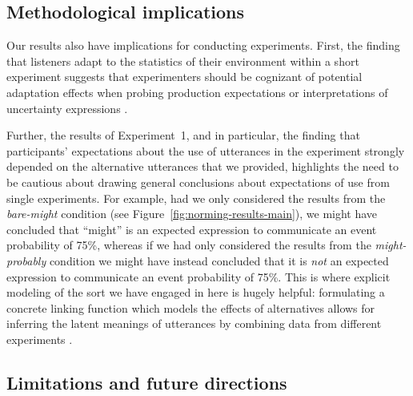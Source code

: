 \documentclass[man, floatsintext]{apa6}
\newcommand{\figref}[1]{Figure~\ref{#1}}
\begin{document}
\subsection{Methodological implications}

Our results also have implications for conducting experiments. First,
the finding that listeners adapt to the statistics of their environment within a short experiment
suggests that experimenters should be cognizant of potential adaptation effects when probing
production expectations or interpretations of uncertainty expressions \parencite[see also][]{Jaeger2010}. 

Further, the results of Experiment~1, and in particular, the finding
that participants' expectations about the use of utterances in the experiment strongly depended on
the alternative utterances that we provided, highlights the need to be cautious about drawing general conclusions about expectations of use from single experiments. For example,
had we only considered the results from the \textit{bare-might} condition (see \figref{fig:norming-results-main}),
we might have concluded that ``might'' is an expected expression to communicate an event probability of 75\%,
whereas if we had only considered the results from the \textit{might-probably} condition we might have instead concluded that it is \emph{not} an expected expression to communicate an event probability of 75\%.
This is where explicit modeling of the sort we have engaged in here is hugely helpful: formulating a concrete linking function which models the effects of 
alternatives allows for inferring the latent meanings of utterances by combining data from different experiments \parencite[see also][for similar approaches]{Franke2014,Peloquin2016}.

\subsection{Limitations and future directions}
\end{document}
